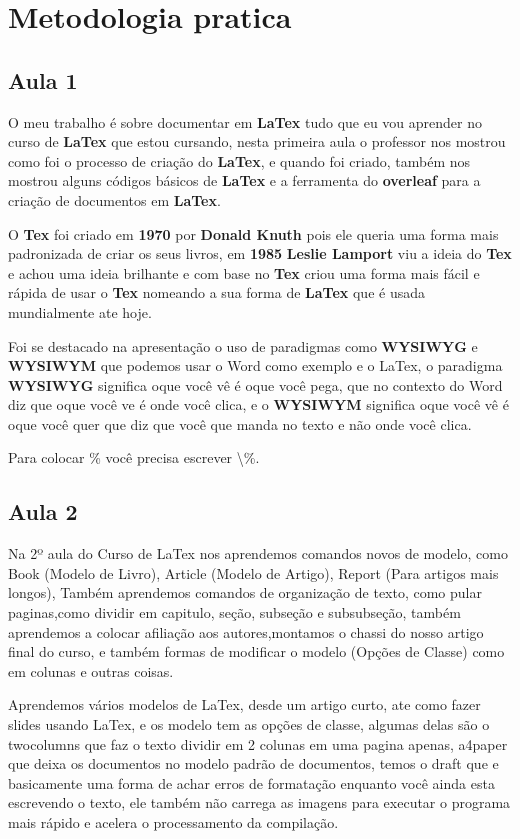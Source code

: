 

\chapter{Metodologia pratica} 
\lipsum[1-3]
\section{Aula 1}
O meu trabalho é sobre documentar em \textbf{LaTex} tudo que eu vou aprender no curso de \textbf{LaTex} que estou cursando, nesta primeira aula o professor nos mostrou como foi o processo de criação do \textbf{LaTex}, e quando foi criado, também nos mostrou alguns códigos básicos de \textbf{LaTex} e a ferramenta do \textbf{overleaf} para a criação de documentos em \textbf{LaTex}.


O \textbf{Tex} foi criado em \textbf{1970} por \textbf{Donald Knuth} pois ele queria uma forma mais padronizada de criar os seus livros, em \textbf{1985} \textbf{Leslie Lamport} viu a ideia do \textbf{Tex} e achou uma ideia brilhante e com base no \textbf{Tex} criou uma forma mais fácil e rápida de usar o \textbf{Tex} nomeando a sua forma de \textbf{LaTex} que é usada mundialmente ate hoje.


Foi se destacado na apresentação o uso de paradigmas como \textbf{WYSIWYG} e \textbf{WYSIWYM} que podemos usar o Word como exemplo e o LaTex, o paradigma \textbf{WYSIWYG} significa oque você vê é oque você pega, que no contexto do Word diz que oque você ve é onde você clica, e o \textbf{WYSIWYM} significa oque você vê é oque você quer que diz que você que manda no texto e não onde você clica.


Para colocar \% você precisa escrever \textbackslash \%.

\section{Aula 2}
Na 2º aula do Curso de LaTex nos aprendemos comandos novos de modelo, como Book (Modelo de Livro), Article (Modelo de Artigo), Report (Para artigos mais longos), Também aprendemos comandos de organização de texto, como pular paginas,como dividir em capitulo, seção, subseção e subsubseção, também aprendemos a colocar afiliação aos autores,montamos o chassi do nosso artigo final do curso, e também formas de modificar o modelo (Opções de Classe) como em colunas e outras coisas.


Aprendemos vários modelos de LaTex, desde um artigo curto, ate como fazer slides usando LaTex, e os modelo tem as opções de classe, algumas delas são o twocolumns que faz o texto dividir em 2 colunas em uma pagina apenas, a4paper que deixa os documentos no modelo padrão de documentos, temos o draft que e basicamente uma forma de achar erros de formatação enquanto você ainda esta escrevendo o texto, ele também não carrega as imagens para executar o programa mais rápido e acelera o processamento da compilação.


